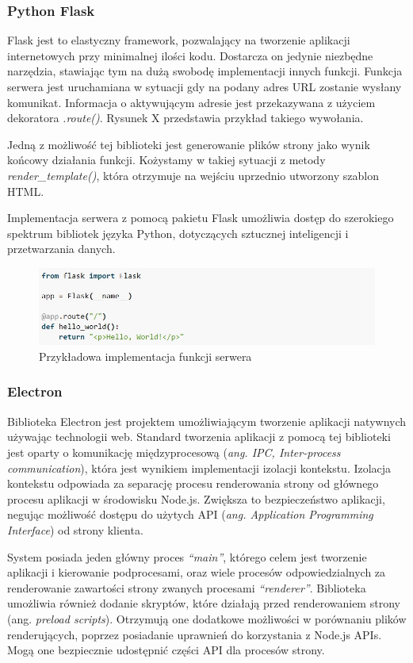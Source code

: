 \documentclass[12pt,a4paper,twoside]{article}
\begin{document}
\subsubsection{Python Flask}
Flask jest to elastyczny framework, pozwalający na tworzenie aplikacji internetowych przy minimalnej ilości kodu. Dostarcza on jedynie niezbędne narzędzia, stawiając tym na dużą swobodę implementacji innych funkcji. 
Funkcja serwera jest uruchamiana w sytuacji gdy na podany adres URL zostanie wysłany komunikat. Informacja o aktywującym adresie jest przekazywana z użyciem dekoratora \textit{.route()}. Rysunek X przedstawia przykład takiego wywołania.\par
Jedną z możliwość tej biblioteki jest generowanie plików strony jako wynik końcowy działania funkcji. Kożystamy w takiej sytuacji z metody \textit{render\_template()}, która otrzymuje na wejściu uprzednio utworzony szablon HTML.\par 
Implementacja serwera z pomocą pakietu Flask umożliwia dostęp do szerokiego spektrum bibliotek języka Python, dotyczących sztucznej inteligencji i przetwarzania danych. 
\begin{figure}[h!]
\centering
  \includegraphics[width=\textwidth]{img/flask.jpg}
  \caption{Przykładowa implementacja funkcji serwera}
\end{figure}
\subsubsection{Electron}
Biblioteka Electron jest projektem umożliwiającym tworzenie aplikacji natywnych używając technologii web. Standard tworzenia aplikacji z pomocą tej biblioteki jest oparty o komunikację międzyprocesową (\textit{ang. IPC, Inter-process communication}), która jest wynikiem implementacji izolacji kontekstu. Izolacja kontekstu odpowiada za separację procesu renderowania strony od głównego procesu aplikacji w środowisku Node.js. Zwiększa to bezpieczeństwo aplikacji, negując możliwość dostępu do użytych API  (\textit{ang. Application Programming Interface}) od strony klienta. \par
System posiada jeden główny proces \textit{``main''}, którego celem jest tworzenie aplikacji i kierowanie podprocesami, oraz wiele procesów odpowiedzialnych za renderowanie zawartości strony zwanych procesami \textit{``renderer''}. Biblioteka umożliwia również dodanie skryptów, które działają przed renderowaniem strony (ang. \textit{preload scripts}). Otrzymują one dodatkowe możliwości w porównaniu plików renderujących, poprzez posiadanie uprawnień do korzystania z Node.js APIs. Mogą one bezpiecznie udostępnić części API dla procesów strony.
\end{document}
